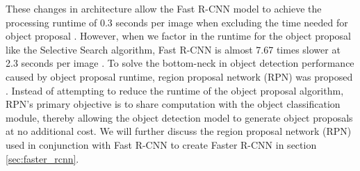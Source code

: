     

These changes in architecture allow the Fast R-CNN model to achieve the processing runtime of 0.3 seconds per image when excluding the time needed for object proposal \cite{fast_rcnn_og}. However, when we factor in the runtime for the object proposal like the Selective Search algorithm, Fast R-CNN is almost 7.67 times slower at 2.3 seconds per image \cite{selective_search_2013}. To solve the bottom-neck in object detection performance caused by object proposal runtime, region proposal network (RPN) was proposed \cite{faster_rcnn_2015}. Instead of attempting to reduce the runtime of the object proposal algorithm, RPN's primary objective is to share computation with the object classification module, thereby allowing the object detection model to generate object proposals at no additional cost. We will further discuss the region proposal network (RPN) used in conjunction with Fast R-CNN to create Faster R-CNN in section \ref{sec:faster_rcnn}.